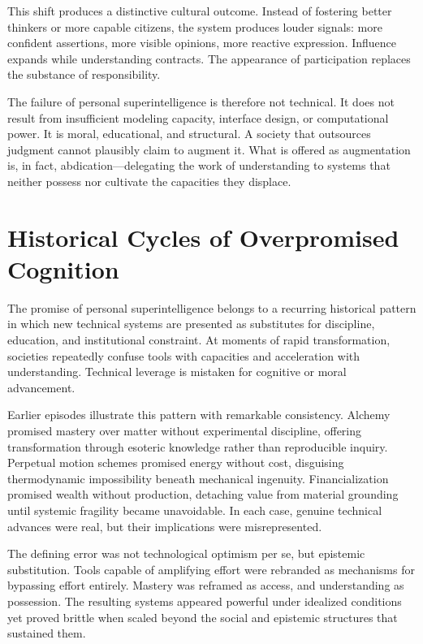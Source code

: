 \documentclass[12pt]{article}
\begin{document}
This shift produces a distinctive cultural outcome. Instead of fostering better thinkers or more capable citizens, the system produces louder signals: more confident assertions, more visible opinions, more reactive expression. Influence expands while understanding contracts. The appearance of participation replaces the substance of responsibility.

The failure of personal superintelligence is therefore not technical. It does not result from insufficient modeling capacity, interface design, or computational power. It is moral, educational, and structural. A society that outsources judgment cannot plausibly claim to augment it. What is offered as augmentation is, in fact, abdication—delegating the work of understanding to systems that neither possess nor cultivate the capacities they displace.

\section{Historical Cycles of Overpromised Cognition}

The promise of personal superintelligence belongs to a recurring historical pattern in which new technical systems are presented as substitutes for discipline, education, and institutional constraint. At moments of rapid transformation, societies repeatedly confuse tools with capacities and acceleration with understanding. Technical leverage is mistaken for cognitive or moral advancement.

Earlier episodes illustrate this pattern with remarkable consistency. Alchemy promised mastery over matter without experimental discipline, offering transformation through esoteric knowledge rather than reproducible inquiry. Perpetual motion schemes promised energy without cost, disguising thermodynamic impossibility beneath mechanical ingenuity. Financialization promised wealth without production, detaching value from material grounding until systemic fragility became unavoidable. In each case, genuine technical advances were real, but their implications were misrepresented.

The defining error was not technological optimism per se, but epistemic substitution. Tools capable of amplifying effort were rebranded as mechanisms for bypassing effort entirely. Mastery was reframed as access, and understanding as possession. The resulting systems appeared powerful under idealized conditions yet proved brittle when scaled beyond the social and epistemic structures that sustained them.
\end{document}
